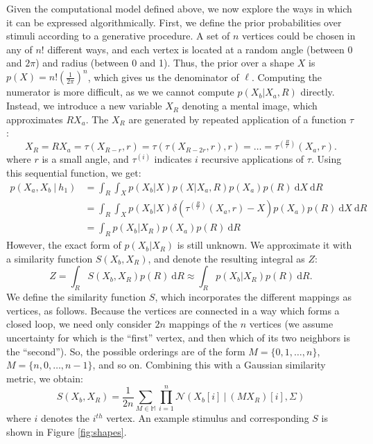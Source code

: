 \documentclass{article} %
\begin{document}
Given the computational model defined above, we now explore the ways
in which it can be expressed algorithmically. First, we define the
prior probabilities over stimuli according to a generative
procedure. A set of $n$ vertices could be chosen in any of $n!$
different ways, and each vertex is located at a random angle (between
0 and $2\pi$) and radius (between 0 and 1). Thus, the prior over a
shape $X$ is $p(X)=n!\left(\frac{1}{2\pi}\right)^n$, which gives us
the denominator of $\ell$. Computing the numerator is more difficult,
as we we cannot compute $p(X_b\vert X_a, R)$ directly. Instead, we
introduce a new variable $X_R$ denoting a mental image, which
approximates $RX_a$. The $X_R$ are generated by repeated application
of a function $\tau$:
\begin{equation}
  X_R=RX_a=\tau(X_{R-r}, r)=\tau(\tau(X_{R-2r}, r), r)=\ldots{}=\tau^{(\frac{R}{r})}(X_a, r).
  \label{eq:tau}
\end{equation} 
where $r$ is a small angle, and $\tau^{(i)}$ indicates $i$ recursive
applications of $\tau$. Using this sequential function, we get:
\begin{align}
  p(X_a, X_b\ \vert \ h_1)&=\int_R \int_{X} p(X_b\vert X) p(X\vert X_a, R)p(X_a)p(R)\ \mathrm{d}X\ \mathrm{d}R \nonumber \\
  &= \int_R \int_X p(X_b\vert X)\delta(\tau^{(\frac{R}{r})}(X_a, r)-X)p(X_a)p(R)\ \mathrm{d}X\ \mathrm{d}R \nonumber \\
  &= \int_R p(X_b\vert X_R)p(X_a)p(R)\ \mathrm{d}R
\end{align}
However, the exact form of $p(X_b\vert X_R)$ is still unknown. We
approximate it with a similarity function $S(X_b, X_R)$, and denote
the resulting integral as $Z$:
\begin{equation}
Z=\int_R S(X_b, X_R)p(R)\ \mathrm{d}R\approx \int_R p(X_b\vert X_R)p(R)\ \mathrm{d}R.
\label{eq:Z}
\end{equation}
We define the similarity function $S$, which incorporates the
different mappings as vertices, as follows. Because the vertices are
connected in a way which forms a closed loop, we need only consider
$2n$ mappings of the $n$ vertices (we assume uncertainty for which is
the ``first'' vertex, and then which of its two neighbors is the
``second''). So, the possible orderings are of the form $M=\lbrace{}0,
1, \ldots{}, n\rbrace{}$, $M=\lbrace{}n, 0, \ldots{}, n-1\rbrace{}$,
and so on. Combining this with a Gaussian similarity metric, we
obtain:
\begin{equation}
  S(X_b, X_R)=\frac{1}{2n}\sum_{M\in\mathbb{M}}\prod_{i=1}^n\mathcal{N}(X_b[i]\ \vert \ (MX_R)[i], \Sigma)
  \label{eq:similarity}
\end{equation}
where $i$ denotes the $i^{th}$ vertex. An example stimulus and
corresponding $S$ is shown in Figure \ref{fig:shapes}.
\end{document}
